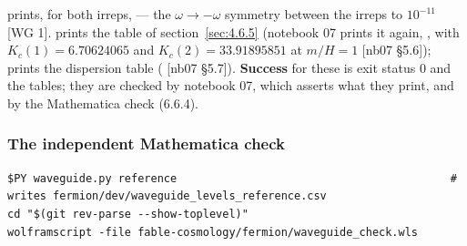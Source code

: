  prints, for both irreps,  --- the $\omega \to -\omega$ symmetry between the irreps to $10^{-11}$ [WG 1].  prints the table of section~\ref{sec:4.6.5} (notebook 07 prints it again, , with $K_{c}(1) = 6.70624065$ and $K_{c}(2) = 33.91895851$ at $m/H = 1$ [nb07 \S{}5.6]);  prints the dispersion table ( [nb07 \S{}5.7]). \textbf{Success} for these is exit status 0 and the tables; they are checked by notebook 07, which asserts what they print, and by the Mathematica check (6.6.4).

\subsubsection{The independent Mathematica check}
\label{sec:6.6.4}

\begin{Verbatim}
$PY waveguide.py reference                                          # writes fermion/dev/waveguide_levels_reference.csv
cd "$(git rev-parse --show-toplevel)"
wolframscript -file fable-cosmology/fermion/waveguide_check.wls
\end{Verbatim}

